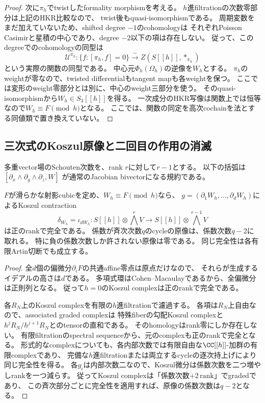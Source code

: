 \begin{proof}
次に$\pi_h$でtwistしたformality morphismを考える。
$h$進filtrationの次数零部分は上記のHKR比較なので、
twist後もquasi-isomorphismである。
周期変数をまだ加えていないため、shifted degree $-1$のcohomologyは
それぞれPoisson Casimirと星積の中心であり、degree $-2$以下の項は存在しない。
従って、このdegreeでのcohomologyの同型は
\[
 \mathcal U^{\pi_h}:
 \{f:[\pi_h,f]=0\}\xrightarrow{\sim} Z(S[[h]],*_{\pi_h})
\]
という実際の関数の同型である。
中心元$\Phi_h(\Omega_h)$の逆像を$W_h$とする。
$\pi_h$のweightが零なので、twisted differentialもtangent mapも各weightを保つ。
ここでは変形のweight零部分とは別に、中心のweight三部分を使う。
そのquasi-isomorphismから$W_h\in S_3[[h]]$を得る。
一次成分のHKR写像は関数上では恒等なので$W_h\equiv F\pmod h$となる。
ここでは、関数の同定を高次cochainを法とする同値類で置き換えていない。
\end{proof}

\subsection{三次式のKoszul原像と二回目の作用の消滅}

多重vector場のSchouten次数を、rank $r$に対して$r-1$とする。
以下の括弧は$[\partial_x\wedge\partial_y\wedge\partial_z,W]$
が通常のJacobian bivectorになる規約である。

\begin{lemma}
\label{fo:lem:regular-gradient}
$F$が滑らかな射影cubicを定め、$W_h\equiv F\pmod h$なら、
$g=(\partial_1W_h,\ldots,\partial_dW_h)$によるKoszul contraction
\[
 \delta_{W_h}=\iota_{dW_h}:
 S[[h]]\otimes\textstyle\bigwedge^r V
 \longrightarrow
 S[[h]]\otimes\textstyle\bigwedge^{r-1}V
\]
は正のrankで完全である。
係数が斉次次数$q$のcycleの原像は、係数次数$q-2$に取れる。
特に負の係数次数しか許されない原像は零である。
同じ完全性は各有限Artin切断でも成立する。
\end{lemma}
\begin{proof}
全$d$個の偏微分$\partial_iF$の共通affine零点は原点だけなので、
それらが生成するイデアルの高さは$d$である。
多項式環はCohen--Macaulayであるから、全偏微分は正則列となる。
従って$h=0$のKoszul complexは正のrankで完全である。

各$R_N$上のKoszul complexを有限の$h$進filtrationで濾過する。
各項は$R_N$上自由なので、associated graded complexは
特殊fiberの勾配Koszul complexと$h^jR_N/h^{j+1}R_N$とのtensorの直和である。
そのhomologyはrank零にしか存在しない。
有限filtrationのspectral sequenceから、元のcomplexも正のrankで完全となる。
形式的なcomplexについても、各内部次数では有限自由な$\CC[[h]]$-加群の有限complexであり、
完備な$h$進filtrationまたは両立するcycleの逐次持上げにより同じ完全性を得る。
各$g_i$は内部次数二なので、Koszul微分は係数次数を二つ増やしrankを一つ減らす。
従ってKoszul complexは「係数次数$+2\,\mathrm{rank}$」でgradedであり、
この斉次部分ごとに完全性を適用すれば、原像の係数次数は$q-2$となる。
\end{proof}

